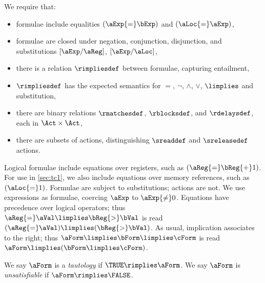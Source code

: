 We require that:
\begin{itemize}
\item formulae include equalities $(\aExp{=}\bExp)$ and $(\aLoc{=}\aExp)$,
\item formulae are closed under negation, conjunction, disjunction, and
  substitutions $[\aExp/\aReg]$, $[\aExp/\aLoc]$,
\item there is a relation $\rimpliesdef$ between
  formulae, capturing entailment, %
\item $\rimpliesdef$ has the expected semantics for $=$, $\lnot$, $\land$, $\lor$,
  $\limplies$ and substitution,
\item there are binary relations $\rmatchesdef$, $\rblocksdef$, and
  $\rdelaysdef$, each in $\Act\times\Act$,
\item there are subsets of actions, distinguishing $\sreaddef$ and $\sreleasedef$ actions.
\end{itemize}

Logical formulae include equations over registers, such as
$(\aReg{=}\bReg{+}1)$.
For use in \textsection\ref{sec:tc1}, we also include equations over memory references, such as $(\aLoc{=}1)$.
Formulae are subject to substitutions; %
actions are not.
We use expressions as formulae, coercing $\aExp$ to $\aExp{\neq}0$.
Equations have precedence over logical operators; thus
$\aReg{=}\aVal\limplies\bReg{>}\bVal$ is read
$(\aReg{=}\aVal)\limplies(\bReg{>}\bVal)$.  As usual, implication associates to the
right; thus $\aForm\limplies\bForm\limplies\cForm$ is read
$\aForm\limplies(\bForm\limplies\cForm)$.

We say
$\aForm$ is a \emph{tautology} if $\TRUE \rimplies \aForm$.
We say
$\aForm$ is \emph{unsatisfiable} if $\aForm \rimplies \FALSE$.


